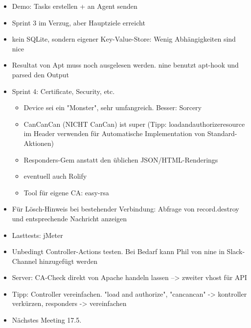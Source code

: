 \documentclass[class=scrbook,crop=false]{standalone}
\begin{document}
	\begin{itemize}
        \item Demo: Tasks erstellen + an Agent senden
        \item Sprint 3 im Verzug, aber Hauptziele erreicht
        \item kein SQLite, sondern eigener Key-Value-Store: Wenig Abhängigkeiten sind nice
        \item Resultat von Apt muss noch ausgelesen werden. \gls{nine} benutzt apt-hook und parsed den Output
        \item Sprint 4: Certificate, Security, etc.
        \begin{itemize}
            \item Device sei ein "Monster", sehr umfangreich. Besser: Sorcery
            \item CanCanCan (NICHT CanCan) ist super (Tipp: load\textunderscore and\textunderscore authorize\textunderscore resource im Header verwenden für Automatische Implementation von Standard-Aktionen)
            \item Responders-Gem anstatt den üblichen JSON/HTML-Renderings
            \item eventuell auch Rolify
            \item Tool für eigene CA: easy-rsa
        \end{itemize}
        \item Für Lösch-Hinweis bei bestehender Verbindung: Abfrage von record.destroy und entsprechende Nachricht anzeigen
        \item Lasttests: jMeter
        \item Unbedingt Controller-Actions testen. Bei Bedarf kann Phil von \gls{nine} in Slack-Channel hinzugefügt werden
        \item Server: CA-Check direkt von Apache handeln lassen --> zweiter vhost für API
        \item Tipp: Controller vereinfachen. "load and authorize", "cancancan" -> kontroller verkürzen, responders -> vereinfachen
        \item Nächstes Meeting 17.5.
    \end{itemize}
    
\end{document}
